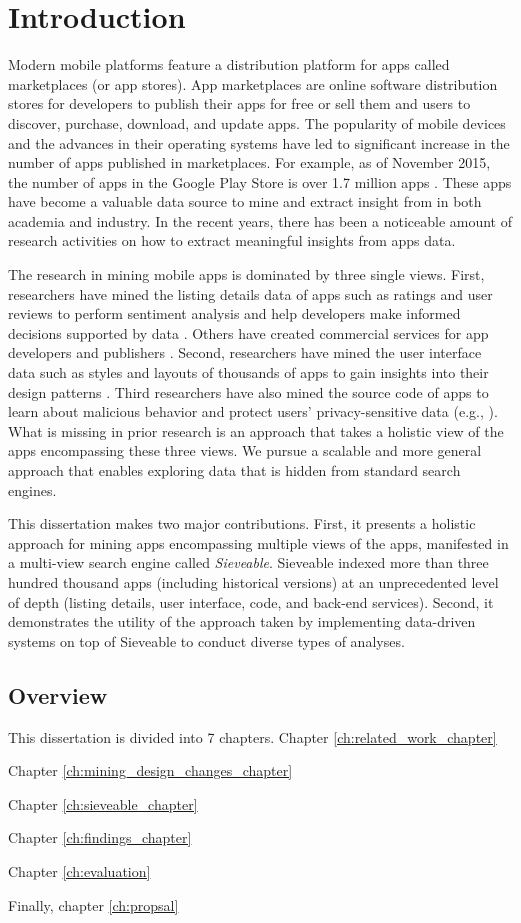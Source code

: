 \chapter{Introduction}
\label{ch:intro__chapter}
Modern mobile platforms feature a distribution platform for apps called marketplaces (or app stores).
App marketplaces are online software distribution stores for developers to publish their apps for free or sell them and users to discover, purchase, download, and update apps.
The popularity of mobile devices and the advances in their operating systems have led to significant increase in the number of apps published in marketplaces.
For example, as of November 2015, the number of apps in the Google Play Store is over 1.7 million apps \cite{appbrain_play_apps}.
These apps have become a valuable data source to mine and extract insight from in both academia and industry.
In the recent years, there has been a noticeable amount of research activities on how to extract meaningful insights from apps data. 

The research in mining mobile apps is dominated by three single views.
First, researchers have mined the listing details data of apps such as ratings and user reviews to perform sentiment analysis and help developers make informed decisions supported by data \cite{fu_2013_KDD,chen_2014_ICSE,kong_2015_CCS}. 
Others have created commercial services for app developers and publishers \cite{appfigures,applause,appannie}.
Second, researchers have mined the user interface data such as styles and layouts of thousands of apps to gain insights into their design patterns \cite{shirazi_EICS_2013,Alharbi_2015_MobileHCI}.
Third researchers have also mined the source code of apps to learn about malicious behavior and protect users' privacy-sensitive data (e.g., \cite{zhou_2012_SP_dissecting,lu_2012_CCS,Arzt_2014_PLDI}).
What is missing in prior research is an approach that takes a holistic view of the apps encompassing these three views. We pursue a scalable and more general approach that enables exploring data that is hidden from standard search engines.


This dissertation makes two major contributions. 
First, it presents a holistic approach for mining apps encompassing multiple views of the apps, manifested in a multi-view search engine called \textit{Sieveable}.
Sieveable indexed more than three hundred thousand apps (including historical versions) at an unprecedented level of depth (listing details, user interface, code, and back-end services).
Second, it demonstrates the utility of the approach taken by implementing data-driven systems on top of Sieveable to conduct diverse types of analyses.

\section{Overview}
This dissertation is divided into 7 chapters. Chapter \ref{ch:related_work_chapter}

Chapter \ref{ch:mining_design_changes_chapter}

Chapter \ref{ch:sieveable_chapter}

Chapter \ref{ch:findings_chapter}

Chapter \ref{ch:evaluation}

Finally, chapter \ref{ch:propsal}